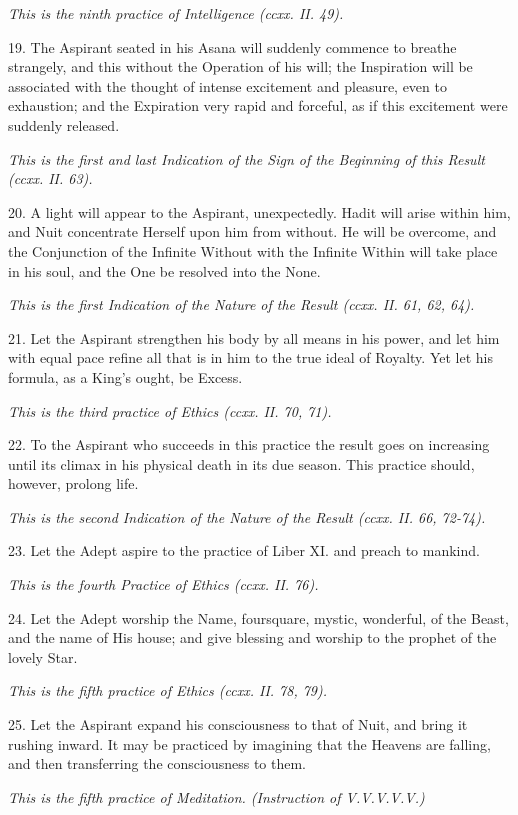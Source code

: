 \textit{This is the ninth practice of Intelligence (ccxx. II. 49).}

19. The Aspirant seated in his Asana will suddenly commence to breathe strangely, and this without the Operation of his will; the Inspiration will be associated with the thought of intense excitement and pleasure, even to exhaustion; and the Expiration very rapid and forceful, as if this excitement were suddenly released.

\textit{This is the first and last Indication of the Sign of the Beginning of this Result (ccxx. II. 63).}

20. A light will appear to the Aspirant, unexpectedly. Hadit will arise within him, and Nuit concentrate Herself upon him from without. He will be overcome, and the Conjunction of the Infinite Without with the Infinite Within will take place in his soul, and the One be resolved into the None.

\textit{This is the first Indication of the Nature of the Result (ccxx. II. 61, 62, 64).}

21. Let the Aspirant strengthen his body by all means in his power, and let him with equal pace refine all that is in him to the true ideal of Royalty. Yet let his formula, as a King's ought, be Excess.

\textit{This is the third practice of Ethics (ccxx. II. 70, 71).}

22. To the Aspirant who succeeds in this practice the result goes on increasing until its climax in his physical death in its due season. This practice should, however, prolong life.

\textit{This is the second Indication of the Nature of the Result (ccxx. II. 66, 72-74).}

23. Let the Adept aspire to the practice of Liber XI. and preach to mankind.

\textit{This is the fourth Practice of Ethics (ccxx. II. 76).}

24. Let the Adept worship the Name, foursquare, mystic, wonderful, of the Beast, and the name of His house; and give blessing and worship to the prophet of the lovely Star.

\textit{This is the fifth practice of Ethics (ccxx. II. 78, 79).}

25. Let the Aspirant expand his consciousness to that of Nuit, and bring it rushing inward. It may be practiced by imagining that the Heavens are falling, and then transferring the consciousness to them.

\textit{This is the fifth practice of Meditation. (Instruction of V.V.V.V.V.)}

